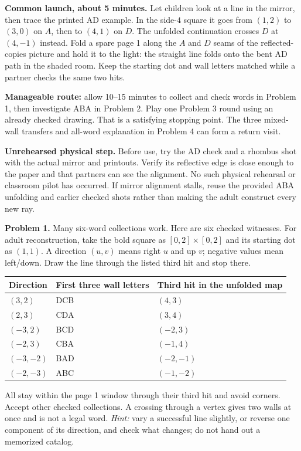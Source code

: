 \documentclass[11pt,letterpaper]{article}
\newcommand{\sectiontitle}[1]{\par\vspace{4pt}{\large\bfseries #1}\par}
\newcommand{\answer}[1]{\par\vspace{3pt}\textbf{Problem #1.} }
\begin{document}
\textbf{Common launch, about 5 minutes.} Let children look at a line in the mirror, then trace the printed AD example. In the side-$4$ square it goes from $(1,2)$ to $(3,0)$ on $A$, then to $(4,1)$ on $D$. The unfolded continuation crosses $D$ at $(4,-1)$ instead. Fold a spare page 1 along the $A$ and $D$ seams of the reflected-copies picture and hold it to the light: the straight line folds onto the bent AD path in the shaded room. Keep the starting dot and wall letters matched while a partner checks the same two hits.

\textbf{Manageable route:} allow 10--15 minutes to collect and check words in Problem 1, then investigate ABA in Problem 2. Play one Problem 3 round using an already checked drawing. That is a satisfying stopping point. The three mixed-wall transfers and all-word explanation in Problem 4 can form a return visit.

\textbf{Unrehearsed physical step.} Before use, try the AD check and a rhombus shot with the actual mirror and printouts. Verify its reflective edge is close enough to the paper and that partners can see the alignment. No such physical rehearsal or classroom pilot has occurred. If mirror alignment stalls, reuse the provided ABA unfolding and earlier checked shots rather than making the adult construct every new ray.
\newpage
\sectiontitle{Answers and optional hints}
\answer{1} Many six-word collections work. Here are six checked witnesses. For adult reconstruction, take the bold square as $[0,2]\times[0,2]$ and its starting dot as $(1,1)$. A direction $(u,v)$ means right $u$ and up $v$; negative values mean left/down. Draw the line through the listed third hit and stop there.
\begin{center}\renewcommand{\arraystretch}{1.25}
\begin{tabular}{@{}lll@{}}
Direction & First three wall letters & Third hit in the unfolded map\\\hline
$(3,2)$ & DCB & $(4,3)$\\
$(2,3)$ & CDA & $(3,4)$\\
$(-3,2)$ & BCD & $(-2,3)$\\
$(-2,3)$ & CBA & $(-1,4)$\\
$(-3,-2)$ & BAD & $(-2,-1)$\\
$(-2,-3)$ & ABC & $(-1,-2)$
\end{tabular}\end{center}
All stay within the page 1 window through their third hit and avoid corners. Accept other checked collections. A crossing through a vertex gives two walls at once and is not a legal word. \textit{Hint:} vary a successful line slightly, or reverse one component of its direction, and check what changes; do not hand out a memorized catalog.
\end{document}
